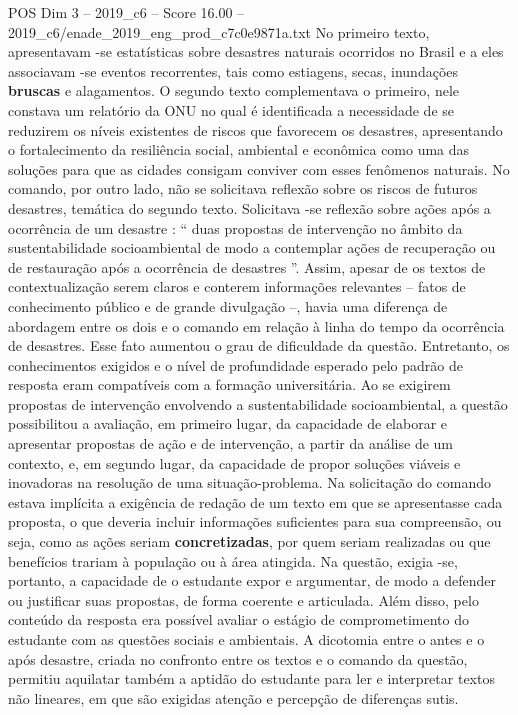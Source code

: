 \begin{textsample}{POS Dim 3 – 2019\_c6 – Score 16.00 – 2019\_c6/enade\_2019\_eng\_prod\_c7c0e9871a.txt}
No primeiro texto, apresentavam -se estatísticas sobre desastres naturais ocorridos no Brasil e a eles associavam -se eventos recorrentes, tais como estiagens, secas, inundações \textbf{bruscas} e alagamentos.
O segundo texto complementava o primeiro, nele constava um relatório da ONU no qual é identificada a necessidade de se reduzirem os níveis existentes de riscos que favorecem os desastres, apresentando o fortalecimento da resiliência social, ambiental e econômica como uma das soluções para que as cidades consigam conviver com esses fenômenos naturais.
No comando, por outro lado, não se solicitava reflexão sobre os riscos de futuros desastres, temática do segundo texto.
Solicitava -se reflexão sobre ações após a ocorrência de um desastre : “ duas propostas de intervenção no âmbito da sustentabilidade socioambiental de modo a contemplar ações de recuperação ou de restauração após a ocorrência de desastres ”.
Assim, apesar de os textos de contextualização serem claros e conterem informações relevantes – fatos de conhecimento público e de grande divulgação –, havia uma diferença de abordagem entre os dois e o comando em relação à linha do tempo da ocorrência de desastres.
Esse fato aumentou o grau de dificuldade da questão.
Entretanto, os conhecimentos exigidos e o nível de profundidade esperado pelo padrão de resposta eram compatíveis com a formação universitária.
Ao se exigirem propostas de intervenção envolvendo a sustentabilidade socioambiental, a questão possibilitou a avaliação, em primeiro lugar, da capacidade de elaborar e apresentar propostas de ação e de intervenção, a partir da análise de um contexto, e, em segundo lugar, da capacidade de propor soluções viáveis e inovadoras na resolução de uma situação-problema.
Na solicitação do comando estava implícita a exigência de redação de um texto em que se apresentasse cada proposta, o que deveria incluir informações suficientes para sua compreensão, ou seja, como as ações seriam \textbf{concretizadas}, por quem seriam realizadas ou que benefícios trariam à população ou à área atingida.
Na questão, exigia -se, portanto, a capacidade de o estudante expor e argumentar, de modo a defender ou justificar suas propostas, de forma coerente e articulada.
Além disso, pelo conteúdo da resposta era possível avaliar o estágio de comprometimento do estudante com as questões sociais e ambientais.
A dicotomia entre o antes e o após desastre, criada no confronto entre os textos e o comando da questão, permitiu aquilatar também a aptidão do estudante para ler e interpretar textos não lineares, em que são exigidas atenção e percepção de diferenças sutis.

\end{textsample}

